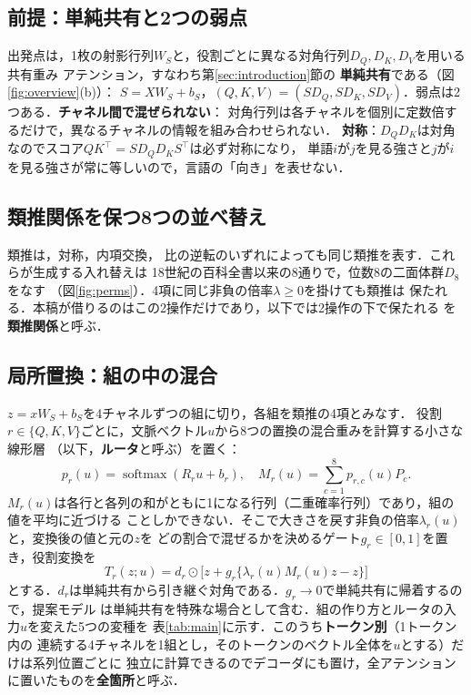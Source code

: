 \documentclass{nlp2026}
\begin{document}
\subsection{前提：単純共有と2つの弱点}
\label{sec:sharing}

出発点は，1枚の射影行列$W_S$と，役割ごとに異なる対角行列$D_Q,D_K,D_V$を用いる共有重み
アテンション\cite{kowsher2025separate}，すなわち第\ref{sec:introduction}節の
\textbf{単純共有}である（図\ref{fig:overview}(b)）：
$S=XW_S+b_S$，$(Q,K,V)=(SD_Q,SD_K,SD_V)$．弱点は2つある．\textbf{チャネル間で混ぜられない}：
対角行列は各チャネルを個別に定数倍するだけで，異なるチャネルの情報を組み合わせられない．
\textbf{対称}：$D_QD_K$は対角なのでスコア$QK^\top=SD_QD_KS^\top$は必ず対称になり，
単語$i$が$j$を見る強さと$j$が$i$を見る強さが常に等しいので，言語の「向き」を表せない．

\subsection{類推関係を保つ8つの並べ替え}
\label{sec:analogy}

類推は，対称，内項交換，
比の逆転のいずれによっても同じ類推を表す．これらが生成する入れ替えは
18世紀の百科全書\cite{rallier1765proportion}以来の8通りで，位数8の二面体群$D_8$をなす
\cite{lepage2025jiaf}（図\ref{fig:perms}）．4項に同じ非負の倍率$\lambda\ge0$を掛けても類推は
保たれる．本稿が借りるのはこの2操作だけであり，以下では2操作の下で保たれる
を\textbf{類推関係}と呼ぶ．

\subsection{局所置換：組の中の混合}
\label{sec:local}

$z=xW_S+b_S$を4チャネルずつの組に切り，各組を類推の4項とみなす．
役割$r\in\{Q,K,V\}$ごとに，文脈ベクトル$u$から8つの置換の混合重みを計算する小さな線形層
（以下，\textbf{ルータ}と呼ぶ）を置く：
\begin{equation}
 p_r(u)=\operatorname{softmax}(R_ru+b_r),\quad
 M_r(u)=\sum_{c=1}^{8}p_{r,c}(u)P_c.
 \label{eq:router}
\end{equation}
$M_r(u)$は各行と各列の和がともに1になる行列（二重確率行列）であり，組の値を平均に近づける
ことしかできない．そこで大きさを戻す非負の倍率$\lambda_r(u)$と，変換後の値と元の$z$を
どの割合で混ぜるかを決めるゲート$g_r\in[0,1]$を置き，役割変換を
\begin{equation}
 T_r(z;u)=d_r\odot\bigl[z+g_r\{\lambda_r(u)M_r(u)z-z\}\bigr]
 \label{eq:role}
\end{equation}
とする．$d_r$は単純共有から引き継ぐ対角である．$g_r\to0$で単純共有に帰着するので，提案モデル
は単純共有を特殊な場合として含む．組の作り方とルータの入力$u$を変えた5つの変種を
表\ref{tab:main}に示す．このうち\textbf{トークン別}（1トークン内の
連続する4チャネルを1組とし，そのトークンのベクトル全体を$u$とする）だけは系列位置ごとに
独立に計算できるのでデコーダにも置け，全アテンションに置いたものを\textbf{全箇所}と呼ぶ．
\end{document}
